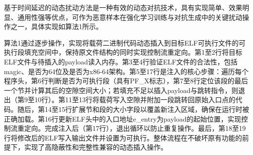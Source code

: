 基于时间延迟的动态扰动方法是一种有效的动态对抗技术，具有实现简单、效果明显、通用性强等优点，可作为恶意样本在强化学习训练与对抗生成中的关键扰动操作之一，具体实现如算法1所示。


算法1通过逐步操作，实现将载荷二进制代码动态插入到目标ELF可执行文件的可执行段填充空间中，保持原文件结构的同时实现控制流重定向。第1至2行将目标ELF文件与待插入的payload读入内存。第3至4行验证ELF文件的合法性，包括magic、是否为64位及是否为x86-64架构。第5至17行是注入的核心步骤：遍历每个程序头，第6行判断是否为可执行段（具有PF\_X标志），第7至8行定位该段的最后一个节并计算其后的空隙空间大小；若填充不足以插入payload与跳转指令，则退出（第9至10行）。第11至13行将载荷写入空隙并附加一段跳转回原始入口点的代码。随后，第14至15行扩展节和段的大小字段以覆盖新注入区域，确保在运行时被正确加载。第16行更新ELF头中的入口地址e\_entry为payload的起始位置，实现控制流重定向。完成注入后（第17行），退出循环以防止重复操作。最后，第18至19行将修改后的ELF写入输出文件并设置为可执行。整体流程在不破坏原有功能的前提下，实现了高隐蔽性和完整性兼容的动态插入操作。



